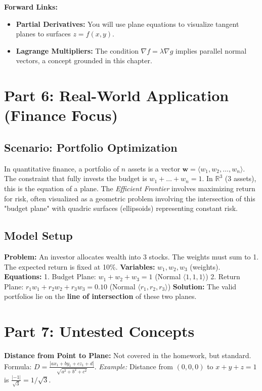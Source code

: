 \documentclass[11pt]{article}
\begin{document}
\textbf{Forward Links:}
\begin{itemize}
    \item \textbf{Partial Derivatives:} You will use plane equations to visualize tangent planes to surfaces $z=f(x,y)$.
    \item \textbf{Lagrange Multipliers:} The condition $\nabla f = \lambda \nabla g$ implies parallel normal vectors, a concept grounded in this chapter.
\end{itemize}

\section{Part 6: Real-World Application (Finance Focus)}

\subsection{Scenario: Portfolio Optimization}
In quantitative finance, a portfolio of $n$ assets is a vector $\mathbf{w} = \langle w_1, w_2, \dots, w_n \rangle$. The constraint that fully invests the budget is $w_1 + \dots + w_n = 1$. In $\mathbb{R}^3$ (3 assets), this is the equation of a plane. The \textit{Efficient Frontier} involves maximizing return for risk, often visualized as a geometric problem involving the intersection of this "budget plane" with quadric surfaces (ellipsoids) representing constant risk.

\subsection{Model Setup}
\textbf{Problem:} An investor allocates wealth into 3 stocks. The weights must sum to 1. The expected return is fixed at 10\%.
\textbf{Variables:} $w_1, w_2, w_3$ (weights).
\textbf{Equations:}
1. Budget Plane: $w_1 + w_2 + w_3 = 1$ (Normal $\langle 1,1,1 \rangle$)
2. Return Plane: $r_1 w_1 + r_2 w_2 + r_3 w_3 = 0.10$ (Normal $\langle r_1, r_2, r_3 \rangle$)
\textbf{Solution:} The valid portfolios lie on the \textbf{line of intersection} of these two planes.

\section{Part 7: Untested Concepts}
\textbf{Distance from Point to Plane:}
Not covered in the homework, but standard.
Formula: $D = \frac{|ax_1 + by_1 + cz_1 + d|}{\sqrt{a^2+b^2+c^2}}$.
\textit{Example:} Distance from $(0,0,0)$ to $x+y+z=1$ is $\frac{|-1|}{\sqrt{3}} = 1/\sqrt{3}$.
\end{document}
